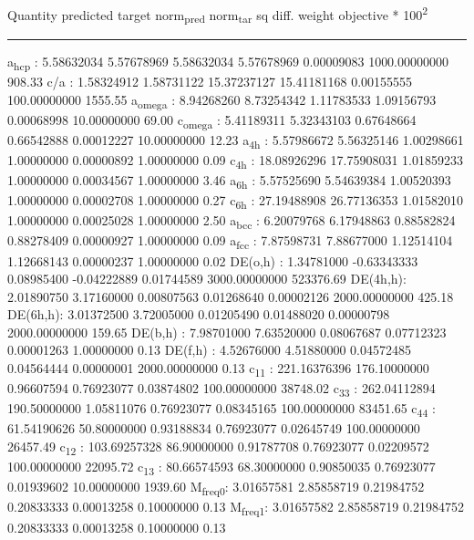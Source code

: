 \documentclass[11pt]{article}
\begin{document}
Quantity      predicted    target     norm\textsubscript{pred}   norm\textsubscript{tar}    sq diff.      weight    objective * 100\textsuperscript{2} 

\noindent\rule{\textwidth}{0.5pt}
a\textsubscript{hcp}   :   5.58632034   5.57678969   5.58632034   5.57678969   0.00009083 1000.00000000       908.33
c/a     :   1.58324912   1.58731122  15.37237127  15.41181168   0.00155555 100.00000000      1555.55
a\textsubscript{omega} :   8.94268260   8.73254342   1.11783533   1.09156793   0.00068998  10.00000000        69.00
c\textsubscript{omega} :   5.41189311   5.32343103   0.67648664   0.66542888   0.00012227  10.00000000        12.23
a\textsubscript{4h}    :   5.57986672   5.56325146   1.00298661   1.00000000   0.00000892   1.00000000         0.09
c\textsubscript{4h}    :  18.08926296  17.75908031   1.01859233   1.00000000   0.00034567   1.00000000         3.46
a\textsubscript{6h}    :   5.57525690   5.54639384   1.00520393   1.00000000   0.00002708   1.00000000         0.27
c\textsubscript{6h}    :  27.19488908  26.77136353   1.01582010   1.00000000   0.00025028   1.00000000         2.50
a\textsubscript{bcc}   :   6.20079768   6.17948863   0.88582824   0.88278409   0.00000927   1.00000000         0.09
a\textsubscript{fcc}   :   7.87598731   7.88677000   1.12514104   1.12668143   0.00000237   1.00000000         0.02
DE(o,h) :   1.34781000  -0.63343333   0.08985400  -0.04222889   0.01744589 3000.00000000    523376.69
DE(4h,h):   2.01890750   3.17160000   0.00807563   0.01268640   0.00002126 2000.00000000       425.18
DE(6h,h):   3.01372500   3.72005000   0.01205490   0.01488020   0.00000798 2000.00000000       159.65
DE(b,h) :   7.98701000   7.63520000   0.08067687   0.07712323   0.00001263   1.00000000         0.13
DE(f,h) :   4.52676000   4.51880000   0.04572485   0.04564444   0.00000001 2000.00000000         0.13
c\textsubscript{11}    : 221.16376396 176.10000000   0.96607594   0.76923077   0.03874802 100.00000000     38748.02
c\textsubscript{33}    : 262.04112894 190.50000000   1.05811076   0.76923077   0.08345165 100.00000000     83451.65
c\textsubscript{44}    :  61.54190626  50.80000000   0.93188834   0.76923077   0.02645749 100.00000000     26457.49
c\textsubscript{12}    : 103.69257328  86.90000000   0.91787708   0.76923077   0.02209572 100.00000000     22095.72
c\textsubscript{13}    :  80.66574593  68.30000000   0.90850035   0.76923077   0.01939602  10.00000000      1939.60
M\textsubscript{freq}\textsubscript{0}:   3.01657581   2.85858719   0.21984752   0.20833333   0.00013258   0.10000000         0.13
M\textsubscript{freq}\textsubscript{1}:   3.01657582   2.85858719   0.21984752   0.20833333   0.00013258   0.10000000         0.13
\end{document}
